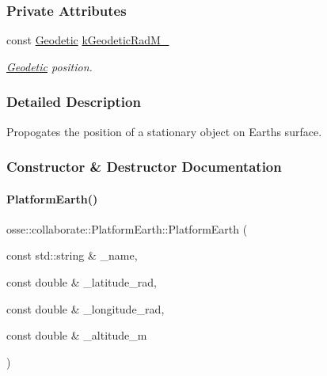 \subsubsection*{Private Attributes}
\begin{DoxyCompactItemize}
\item 
\mbox{\label{classosse_1_1collaborate_1_1_platform_earth_ab79ec0de68f62f6355614bc3963cf44f}} 
const \hyperlink{classosse_1_1collaborate_1_1_geodetic}{Geodetic} \hyperlink{classosse_1_1collaborate_1_1_platform_earth_ab79ec0de68f62f6355614bc3963cf44f}{k\+Geodetic\+Rad\+M\+\_\+}
\begin{DoxyCompactList}\small\item\em \hyperlink{classosse_1_1collaborate_1_1_geodetic}{Geodetic} position. \end{DoxyCompactList}\end{DoxyCompactItemize}


\subsubsection{Detailed Description}
Propogates the position of a stationary object on Earth\textquotesingle{}s surface. 

\subsubsection{Constructor \& Destructor Documentation}
\mbox{\label{classosse_1_1collaborate_1_1_platform_earth_afc5a80925b8a51fbdb93e0cc8eea3607}} 
\paragraph{\texorpdfstring{Platform\+Earth()}{PlatformEarth()}}
{\footnotesize\ttfamily osse\+::collaborate\+::\+Platform\+Earth\+::\+Platform\+Earth (\begin{DoxyParamCaption}\item[{const std\+::string \&}]{\+\_\+name,  }\item[{const double \&}]{\+\_\+latitude\+\_\+rad,  }\item[{const double \&}]{\+\_\+longitude\+\_\+rad,  }\item[{const double \&}]{\+\_\+altitude\+\_\+m }\end{DoxyParamCaption})}



